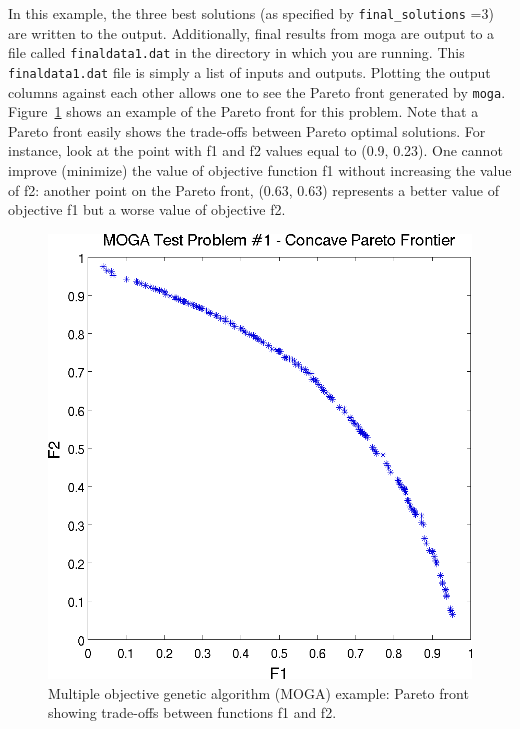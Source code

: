 In this example, the three best solutions (as specified by
\texttt{final\_solutions} =3) are written to the output. Additionally,
final results from moga are output to a file called
\texttt{finaldata1.dat} in the directory in which you are
running. This \texttt{finaldata1.dat} file is simply a list of inputs
and outputs. Plotting the output columns against each other allows one
to see the Pareto front generated by \texttt{moga}.
Figure~\ref{opt:additional:multiobjective:example2:moga_pareto} shows
an example of the Pareto front for this problem. Note that a Pareto
front easily shows the trade-offs between Pareto optimal solutions. For
instance, look at the point with f1 and f2 values equal to (0.9,
0.23). One cannot improve (minimize) the value of objective function
f1 without increasing the value of f2: another point on the Pareto
front, (0.63, 0.63) represents a better value of objective f1 but a
worse value of objective f2.
\begin{figure}[ht!]
  \centering
  \includegraphics[scale=0.75]{images/dakota_mogatest1_pareto_front}
  \caption{Multiple objective genetic algorithm (MOGA) example: Pareto
  front showing trade-offs between functions f1 and f2.}
  \label{opt:additional:multiobjective:example2:moga_pareto}
\end{figure}


